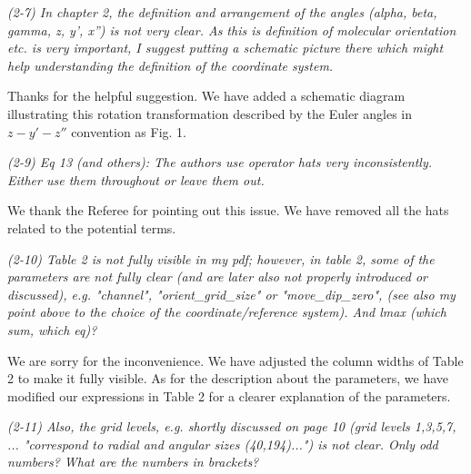 \documentclass[a4paper,11pt]{article}
\begin{document}
\vspace{2em}


\textit{
(2-7)
In chapter 2, the definition and arrangement of the angles (alpha, beta, gamma, z, y', x'') is not very clear. As this is definition of molecular orientation etc. is very important, I suggest putting a schematic picture there which might help understanding the definition of the coordinate system.
}

\vspace{1em}

Thanks for the helpful suggestion.
We have added a schematic diagram illustrating this rotation transformation described by the Euler angles in $z-y'-z''$ convention as Fig. 1.

\vspace{2em}


\textit{
(2-9)
Eq 13 (and others): The authors use operator hats very inconsistently. Either use them throughout or leave them out.
}

\vspace{1em}

We thank the Referee for pointing out this issue.
We have removed all the hats related to the potential terms.

\vspace{2em}


\textit{
(2-10)
Table 2 is not fully visible in my pdf; however, in table 2, some of the parameters are not fully clear (and are later also not properly introduced or discussed), e.g. "channel", "orient\_grid\_size" or "move\_dip\_zero", (see also my point above to the choice of the coordinate/reference system). And lmax (which sum, which eq)?
}

\vspace{1em}

We are sorry for the inconvenience. We have adjusted the column widths of Table 2 to make it fully visible.
As for the description about the parameters, we have modified our expressions in Table 2 for a clearer explanation of the parameters.

\vspace{2em}


\textit{
(2-11)
Also, the grid levels, e.g. shortly discussed on page 10 (grid levels 1,3,5,7, ... "correspond to radial and angular sizes (40,194)...") is not clear. Only odd numbers? What are the numbers in brackets?
}
\end{document}
